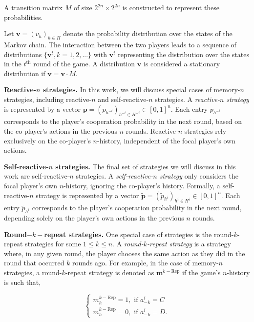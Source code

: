 \documentclass[11pt]{article}
\theoremstyle{definition}
\begin{document}
A transition matrix \(M\) of size \(2^{2n} \times 2^{2n}\) is constructed to
represent these probabilities.

Let \(\mathbf{v} = (v_h)_{h\in H}\) denote the probability distribution over the
states of the Markov chain. The interaction between the two players leads to a
sequence of distributions \(\{\mathbf{v}^{t}, k = 1, 2, ...\}\) with
\(\mathbf{v}^{t}\) representing the distribution over the states in the
\(t^{\text{th}}\) round of the game. A distribution \(\mathbf{v}\) is considered
a stationary distribution if \(\mathbf{v} = \mathbf{v} \cdot M\).

{\bf Reactive-$n$ strategies.}
In this work, we will discuss special cases of memory-$n$ strategies,
including reactive-$n$ and self-reactive-$n$ strategies. A {\it reactive-$n$
strategy} is represented by a vector $\mathbf{p}=(p_{h^{-i}})_{h^{-i}\in H^{-i}}
\in [0, 1]^{n}$. Each entry $p_{h^{-i}}$ corresponds to the player's cooperation
probability in the next round, based on the co-player's actions in the previous
$n$ rounds. Reactive-$n$ strategies rely exclusively on the co-player's
$n$-history, independent of the focal player's own actions.

{\bf Self-reactive-$n$ strategies.}
The final set of strategies we will discuss
in this work are self-reactive-$n$ strategies. A {\it self-reactive-$n$ strategy}
only considers the focal player's own $n$-history, ignoring the co-player's
history. Formally, a self-reactive-$n$ strategy is represented by a vector
$\mathbf{\tilde{p}} = (\tilde{p}_{h^{i}})_{h^{i} \in H^i} \in [0, 1] ^ {n}$.
Each entry $\tilde{p}_{h^{i}}$ corresponds to the player's cooperation
probability in the next round, depending solely on the player's own actions in
the previous $n$ rounds.

{\bf Round$-k-$repeat strategies.}
One special case of strategies is the round-$k$-repeat strategies for some $1\le
k\le n$. A {\it round-$k$-repeat strategy} is a strategy where, in any given round,
the player chooses the same action as they did in the round that occurred $k$
rounds ago. For example, in the case of memory-$n$ strategies, a
round-$k$-repeat strategy is denoted as $\mathbf{m}^{k-\text{Rep}}$ if the
game's $n$-history is such that,

$$
\begin{cases}
  m^{k-\text{Rep}}_h\!=\!1, \text{ if } a^i_{-k}\!=\!C\\[1em]
  m^{k-\text{Rep}}_h\!=\!0, \text{ if } a^i_{-k}\!=\!D.
\end{cases}
$$
\end{document}
